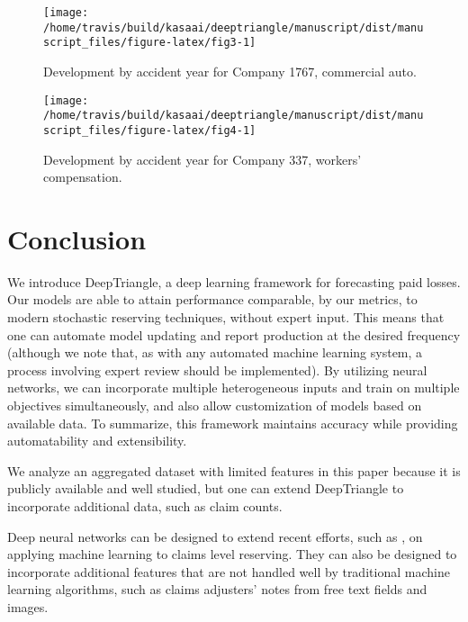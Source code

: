 \documentclass[risks,article,submit,moreauthors,pdftex]{mdpi}
\begin{document}
\begin{figure}

{\centering \texttt{[image: /home/travis/build/kasaai/deeptriangle/manuscript/dist/manuscript\_files/figure-latex/fig3-1]} 

}

\caption{Development by accident year for Company 1767, commercial auto.}\label{fig:fig3}
\end{figure}

\begin{figure}

{\centering \texttt{[image: /home/travis/build/kasaai/deeptriangle/manuscript/dist/manuscript\_files/figure-latex/fig4-1]} 

}

\caption{Development by accident year for Company 337, workers' compensation.}\label{fig:fig4}
\end{figure}

\hypertarget{conclusion}{%
\section{Conclusion}\label{conclusion}}

We introduce DeepTriangle, a deep learning framework for forecasting paid losses. Our models are able to attain performance comparable, by our metrics, to modern stochastic reserving techniques, without expert input. This means that one can automate model updating and report production at the desired frequency (although we note that, as with any automated machine learning system, a process involving expert review should be implemented). By utilizing neural networks, we can incorporate multiple heterogeneous inputs and train on multiple objectives simultaneously, and also allow customization of models based on available data. To summarize, this framework maintains accuracy while providing automatability and extensibility.

We analyze an aggregated dataset with limited features in this paper because it is publicly available and well studied, but one can extend DeepTriangle to incorporate additional data, such as claim counts.

Deep neural networks can be designed to extend recent efforts, such as \citet{wuthrich2018machine}, on applying machine learning to claims level reserving. They can also be designed to incorporate additional features that are not handled well by traditional machine learning algorithms, such as claims adjusters' notes from free text fields and images.
\end{document}
